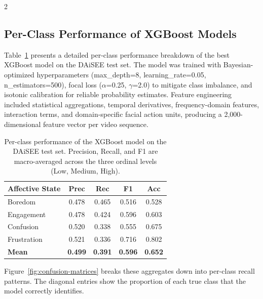\begin{multicols}{2}
  \subsection{Per-Class Performance of XGBoost Models}
  \label{sec:xgboost-per-class}

  Table~\ref{tab:xgboost-per-class} presents a detailed per-class performance breakdown of the best XGBoost model on the DAiSEE test set. The model was trained with Bayesian-optimized hyperparameters (max\_depth=8, learning\_rate=0.05, n\_estimators=500), focal loss ($\alpha$=0.25, $\gamma$=2.0) to mitigate class imbalance, and isotonic calibration for reliable probability estimates. Feature engineering included statistical aggregations, temporal derivatives, frequency-domain features, interaction terms, and domain-specific facial action units, producing a 2,000-dimensional feature vector per video sequence.

  \begin{table}[H]
  \centering
  \caption{Per-class performance of the XGBoost model on the DAiSEE test set. Precision, Recall, and F1 are macro-averaged across the three ordinal levels (Low, Medium, High).}
  \label{tab:xgboost-per-class}
  \begin{tabular}{lcccc}
  \toprule
  \textbf{Affective State} & \textbf{Prec} & \textbf{Rec} & \textbf{F1} & \textbf{Acc} \\
  \midrule
  Boredom     & 0.478 & 0.465 & 0.516 & 0.528 \\
  Engagement  & 0.478 & 0.424 & 0.596 & 0.603 \\
  Confusion   & 0.520 & 0.338 & 0.555 & 0.675 \\
  Frustration & 0.521 & 0.336 & 0.716 & 0.802 \\
  \midrule
  \textbf{Mean} & \textbf{0.499} & \textbf{0.391} & \textbf{0.596} & \textbf{0.652} \\
  \bottomrule
  \end{tabular}
  \end{table}

  \vspace{-0.5cm}

  Figure~\ref{fig:confusion-matrices} breaks these aggregates down into per-class recall patterns. The diagonal entries show the proportion of each true class that the model correctly identifies. %


\end{multicols}
